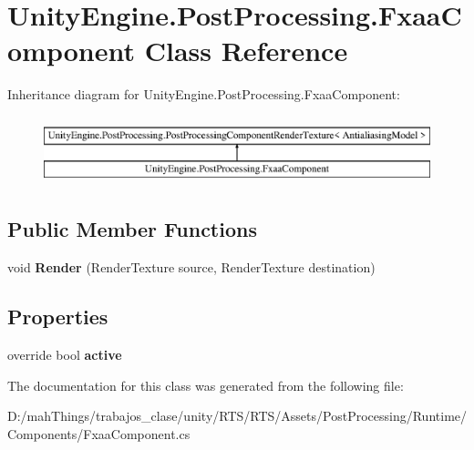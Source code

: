 \hypertarget{class_unity_engine_1_1_post_processing_1_1_fxaa_component}{}\section{Unity\+Engine.\+Post\+Processing.\+Fxaa\+Component Class Reference}
\label{class_unity_engine_1_1_post_processing_1_1_fxaa_component}
Inheritance diagram for Unity\+Engine.\+Post\+Processing.\+Fxaa\+Component\+:\begin{figure}[H]
\begin{center}
\leavevmode
\includegraphics[height=2.000000cm]{class_unity_engine_1_1_post_processing_1_1_fxaa_component}
\end{center}
\end{figure}
\subsection*{Public Member Functions}
\begin{DoxyCompactItemize}
\item 
\mbox{\label{class_unity_engine_1_1_post_processing_1_1_fxaa_component_a6525bbafd720828046143061fa322d9a}} 
void {\bfseries Render} (Render\+Texture source, Render\+Texture destination)
\end{DoxyCompactItemize}
\subsection*{Properties}
\begin{DoxyCompactItemize}
\item 
\mbox{\label{class_unity_engine_1_1_post_processing_1_1_fxaa_component_a957e4d3dd96f10cfb3668b391a188d43}} 
override bool {\bfseries active}
\end{DoxyCompactItemize}


The documentation for this class was generated from the following file\+:\begin{DoxyCompactItemize}
\item 
D\+:/mah\+Things/trabajos\+\_\+clase/unity/\+R\+T\+S/\+R\+T\+S/\+Assets/\+Post\+Processing/\+Runtime/\+Components/Fxaa\+Component.\+cs\end{DoxyCompactItemize}
